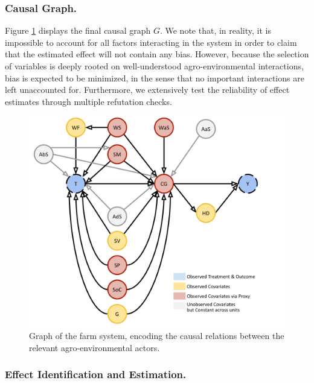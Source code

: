 \documentclass[letterpaper]{article} %
\begin{document}
\subsubsection{Causal Graph.}

Figure \ref{fig:causal-graph} displays the final causal graph $G$. We note that, in reality, it is impossible to account for all factors interacting in the system in order to claim that the estimated effect will not contain any bias. However, because the selection of variables is deeply rooted on well-understood agro-environmental interactions, bias is expected to be minimized, in the sense that no important interactions are left unaccounted for. Furthermore, we extensively test the reliability of effect estimates through multiple refutation checks.

\begin{figure}[!ht]
\includegraphics[scale=0.166]{causal_graph_final.pdf}
\caption{Graph of the farm system, encoding the causal relations between the relevant agro-environmental actors. \label{fig:causal-graph}}
\end{figure}

\subsubsection{Effect Identification and Estimation.}
\end{document}
